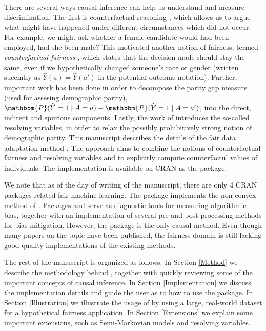 \documentclass[
  notitle]{jss}
\begin{document}
There are several ways causal inference can help us understand and
measure discrimination. The first is counterfactual reasoning
\citep{galles1998axiomatic}, which allows us to argue what might have
happened under different circumstances which did not occur. For example,
we might ask whether a female candidate would had been employed, had she
been male? This motivated another notion of fairness, termed
\textit{counterfactual fairness} \citep{kusner2017counterfactual}, which
states that the decision made should stay the same, even if we
hypothetically changed someone's race or gender (written succintly as
\(\widehat{Y}(a) = \widehat{Y}(a')\) in the potential outcome notation).
Further, important work has been done in order to decompose the parity
gap measure (used for assesing demographic parity),
\(\mathbbm{P}(\widehat{Y} = 1 \mid A = a) - \mathbbm{P}(\widehat{Y} = 1 \mid A = a')\),
into the direct, indirect and spurious components. Lastly, the work of
\cite{kilbertus2017avoiding} introduces the so-called resolving
variables, in order to relax the possibly prohibitively strong notion of
demographic parity. This manuscript describes the details of the fair
data adaptation method \citep{plecko2020fair}. The approach aims to
combine the notions of counterfactual fairness and resolving variables
and to explicitly compute counterfactul values of individuals. The
implementation is available on CRAN as the  package.

We note that as of the day of writing of the manuscript, there are only
4 CRAN packages related fair machine learning. The  package
implements the non-convex method of \cite{komiyama2018nonconvex}.
Packages  and  serve as diagnostic tools
for measuring algorithmic bias, together with an implementation of
several pre and post-processing methods for bias mitigation. However,
the  package is the only causal method. Even though many
papers on the topic have been published, the fairness domain is still
lacking good quality implementations of the existing methods.

The rest of the manuscript is organized as follows. In Section
\ref{Method} we describe the methodology behind ,
together with quickly reviewing some of the important concepts of causal
inference. In Section \ref{Implementation} we discuss the implementation
details and guide the user as to how to use the package. In Section
\ref{Illustration} we illustrate the usage of  by using a
large, real-world dataset for a hypothetical fairness application. In
Section \ref{Extensions} we explain some important extensions, such as
Semi-Markovian models and resolving variables.
\end{document}

